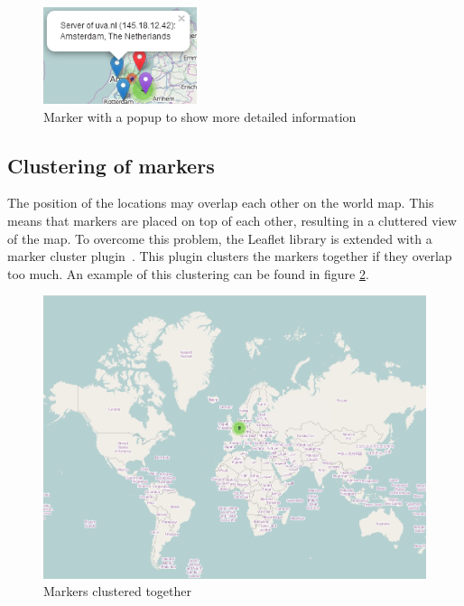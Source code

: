 \documentclass[twoside,openright,notitlepage]{uva-bachelor-thesis}
\begin{document}
\begin{figure}[h!]
    \centering
    \includegraphics[width=0.4\textwidth, center]{img/popup.PNG}
    \caption{Marker with a popup to show more detailed information}
    \label{fig:popup}
\end{figure}

\FloatBarrier
\subsection{Clustering of markers}
The position of the locations may overlap each other on the world map. This means that markers are placed on top of each other, resulting in a cluttered view of the map. To overcome this problem, the Leaflet library is extended with a marker cluster plugin~\cite{leaflet2}. This plugin clusters the markers together if they overlap too much. An example of this clustering can be found in figure \ref{fig:cluster}.

\begin{figure}[h!]
    \centering
    \includegraphics[width=1.0\textwidth, center]{img/cluster2.PNG}
    \caption{Markers clustered together}
    \label{fig:cluster}
\end{figure}
\end{document}
